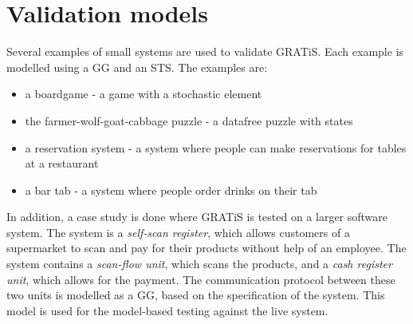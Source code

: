 \section{Validation models}\label{sec:model-examples}

Several examples of small systems are used to validate GRATiS. Each example is modelled using a GG and an STS. The examples are:
\begin{itemize}
\item a boardgame - a game with a stochastic element
\item the farmer-wolf-goat-cabbage puzzle - a datafree puzzle with states
\item a reservation system - a system where people can make reservations for tables at a restaurant
\item a bar tab - a system where people order drinks on their tab
\begin{comment}
\item a communication protocol
\end{comment}
\end{itemize}

In addition, a case study is done where GRATiS is tested on a larger software system. The system is a \textit{self-scan register}, which allows customers of a supermarket to scan and pay for their products without help of an employee. The system contains a \textit{scan-flow unit}, which scans the products, and a \textit{cash register unit}, which allows for the payment. The communication protocol between these two units is modelled as a GG, based on the specification of the system. This model is used for the model-based testing against the live system.
